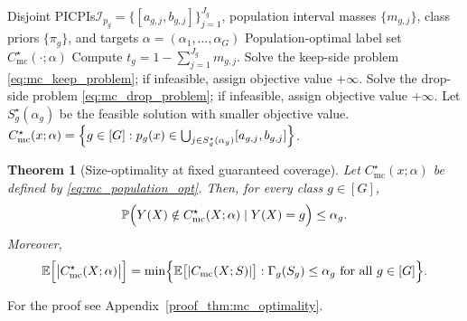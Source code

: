\documentclass[11pt]{article}
\theoremstyle{statplain}
\newtheorem{theorem}{Theorem}[section]
\theoremstyle{statdefinition}
\newcommand{\mc}{\mathrm{mc}}
\newcommand{\E}{\mathbb{E}}
\newcommand{\PP}{\mathbb{P}}
\newcommand{\0}{\mathbf{0}}
\newcommand{\I}{\mathcal{I}}
\newcommand{\intervalset}{\I} %
\newcommand{\numClass}{G} %
\newcommand{\iteratorClass}{g}
\newcommand{\titleShorts}{PICPIs\xspace}
\begin{document}
\begin{algorithm}[t] 
\caption{Constructing population-optimal label set} %
\label{alg:mc_population_optimal}
\begin{algorithmic}[1]
\Require Disjoint \titleShorts $\intervalset_{p_\iteratorClass}=\{[a_{\iteratorClass,j},b_{\iteratorClass,j}]\}_{j=1}^{J_\iteratorClass}$, population interval masses $\{m_{\iteratorClass,j}\}$, class priors $\{\pi_\iteratorClass\}$, and targets $\alpha=(\alpha_1,\ldots,\alpha_\numClass)$
\Ensure Population-optimal label set $C_{\mc}^\star(\cdot;\alpha)$
\For{$\iteratorClass=1$ to $\numClass$}
    \State Compute $t_\iteratorClass = 1-\sum_{j=1}^{J_\iteratorClass} m_{\iteratorClass,j}$.
    \State Solve the keep-side problem \eqref{eq:mc_keep_problem}; if infeasible, assign objective value $+\infty$.
    \State Solve the drop-side problem \eqref{eq:mc_drop_problem}; if infeasible, assign objective value $+\infty$.
    \State Let $S_\iteratorClass^\star(\alpha_\iteratorClass)$ be the feasible solution with smaller objective value.
\EndFor
\State \Return $C_{\mc}^\star(x;\alpha)=\Bigl\{\iteratorClass\in[\numClass]: p_\iteratorClass(x)\in \bigcup_{j\in S_\iteratorClass^\star(\alpha_\iteratorClass)} [a_{\iteratorClass,j},b_{\iteratorClass,j}]\Bigr\}$.
\end{algorithmic}
\end{algorithm}

\begin{theorem}[Size-optimality at fixed guaranteed coverage]\label{thm:mc_optimality}
Let $C_{\mc}^\star(x;\alpha)$ be defined by \eqref{eq:mc_population_opt}.
Then, for every class $\iteratorClass\in[\numClass]$,
\[
\PP\Bigl(Y(X)\notin C_{\mc}^\star(X;\alpha)\mid Y(X)=\iteratorClass\Bigr)
\le
\alpha_\iteratorClass.
\]
Moreover,
\[
\E\Bigl[\bigl|C_{\mc}^\star(X;\alpha)\bigr|\Bigr]
=
\min\Bigl\{
\E\bigl[|C_{\mc}(X;S)|\bigr]:
\Gamma_{\iteratorClass}(S_\iteratorClass)\le \alpha_\iteratorClass
\text{ for all }\iteratorClass\in[\numClass]
\Bigr\}.
\]
\end{theorem}


For the proof see
Appendix~\ref{proof_thm:mc_optimality}.
\end{document}
